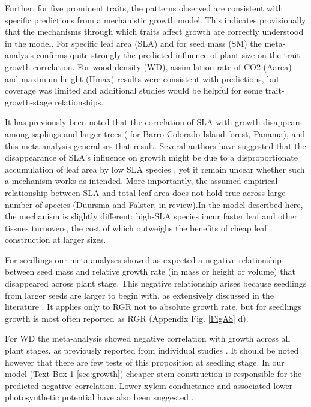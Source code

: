 \documentclass[a4paper]{article}\usepackage[]{graphicx}\usepackage[]{color}
\begin{document}
Further, for five prominent traits, the patterns observed are consistent with specific predictions from a mechanistic growth model. This indicates provisionally that the mechanisms through which traits affect growth are correctly understood in the model. For specific leaf area (SLA) and for seed mass (SM) the meta-analysis confirms quite strongly the predicted influence of plant size on the trait-growth correlation. For wood density (WD), assimilation rate of CO2 (Aarea) and maximum height (Hmax) results were consistent with predictions, but coverage was limited and additional studies would be helpful for some trait-growth-stage relationships. 

It has previously been noted that the correlation of SLA with growth disappears among saplings and larger trees (\citealt{Wright:2010tp} for Barro Colorado Island forest, Panama), and this meta-analysis generalises that result. Several authors have suggested that the disappearance of SLA's influence on growth might be due to a disproportionate accumulation of leaf area by low SLA species \citep{Reich:1992wm,Poorter:2008iu,Wright:2010tp}, yet it remain uncear whether such a mechanism works as intended. More importantly, the assumed empirical relationship between SLA and total leaf area does not hold true across large number of species (Duursma and Falster, in review).In the model described here, the mechanism is slightly different: high-SLA species incur faster leaf and other tissues turnovers, the cost of which outweighs the benefits of cheap leaf construction at larger sizes.

For seedlings our meta-analyses showed as expected a negative relationship between seed mass and relative growth rate (in mass or height or volume) that disappeared across plant stage. This negative relationship arises because seedlings from larger seeds are larger to begin with, as extensively discussed in the literature \citep[reviewed by][]{Turnbull:2012ew}. It applies only to RGR not to absolute growth rate, but for seedlings growth is most often reported as RGR (Appendix Fig. \ref{FigA8} d).

For WD the meta-analysis showed negative correlation with growth across all plant stages, as previously reported from individual studies \citep{Wright:2010tp,Ruger:2012jv}. It should be noted however that there are few tests of this proposition at seedling stage. In our model (Text Box 1 \ref{sec:growth}) cheaper stem construction is responsible for the predicted negative correlation. Lower xylem conductance and associated lower photosynthetic potential have also been suggested \citep[reviewed by][]{Chave:2009iy}. 
\end{document}
